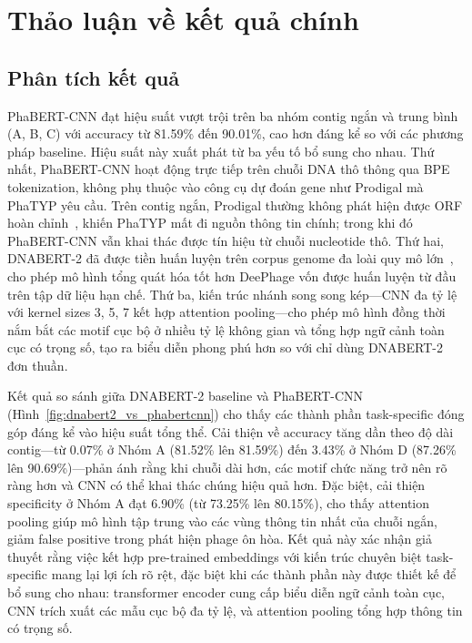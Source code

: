 \section{Thảo luận về kết quả chính}
\label{sec:discussion}

\subsection{Phân tích kết quả}
\label{sec:result_analysis}

PhaBERT-CNN đạt hiệu suất vượt trội trên ba nhóm contig ngắn và trung bình (A, B, C) với accuracy từ 81.59\% đến 90.01\%, cao hơn đáng kể so với các phương pháp baseline. Hiệu suất này xuất phát từ ba yếu tố bổ sung cho nhau. Thứ nhất, PhaBERT-CNN hoạt động trực tiếp trên chuỗi DNA thô thông qua BPE tokenization, không phụ thuộc vào công cụ dự đoán gene như Prodigal mà PhaTYP yêu cầu. Trên contig ngắn, Prodigal thường không phát hiện được ORF hoàn chỉnh~\cite{trimble2012short}, khiến PhaTYP mất đi nguồn thông tin chính; trong khi đó PhaBERT-CNN vẫn khai thác được tín hiệu từ chuỗi nucleotide thô. Thứ hai, DNABERT-2 đã được tiền huấn luyện trên corpus genome đa loài quy mô lớn~\cite{zhou2023dnabert}, cho phép mô hình tổng quát hóa tốt hơn DeePhage vốn được huấn luyện từ đầu trên tập dữ liệu hạn chế. Thứ ba, kiến trúc nhánh song song kép—CNN đa tỷ lệ với kernel sizes 3, 5, 7 kết hợp attention pooling—cho phép mô hình đồng thời nắm bắt các motif cục bộ ở nhiều tỷ lệ không gian và tổng hợp ngữ cảnh toàn cục có trọng số, tạo ra biểu diễn phong phú hơn so với chỉ dùng DNABERT-2 đơn thuần.

Kết quả so sánh giữa DNABERT-2 baseline và PhaBERT-CNN (Hình~\ref{fig:dnabert2_vs_phabertcnn}) cho thấy các thành phần task-specific đóng góp đáng kể vào hiệu suất tổng thể. Cải thiện về accuracy tăng dần theo độ dài contig—từ 0.07\% ở Nhóm A (81.52\% lên 81.59\%) đến 3.43\% ở Nhóm D (87.26\% lên 90.69\%)—phản ánh rằng khi chuỗi dài hơn, các motif chức năng trở nên rõ ràng hơn và CNN có thể khai thác chúng hiệu quả hơn. Đặc biệt, cải thiện specificity ở Nhóm A đạt 6.90\% (từ 73.25\% lên 80.15\%), cho thấy attention pooling giúp mô hình tập trung vào các vùng thông tin nhất của chuỗi ngắn, giảm false positive trong phát hiện phage ôn hòa. Kết quả này xác nhận giả thuyết rằng việc kết hợp pre-trained embeddings với kiến trúc chuyên biệt task-specific mang lại lợi ích rõ rệt, đặc biệt khi các thành phần này được thiết kế để bổ sung cho nhau: transformer encoder cung cấp biểu diễn ngữ cảnh toàn cục, CNN trích xuất các mẫu cục bộ đa tỷ lệ, và attention pooling tổng hợp thông tin có trọng số.

